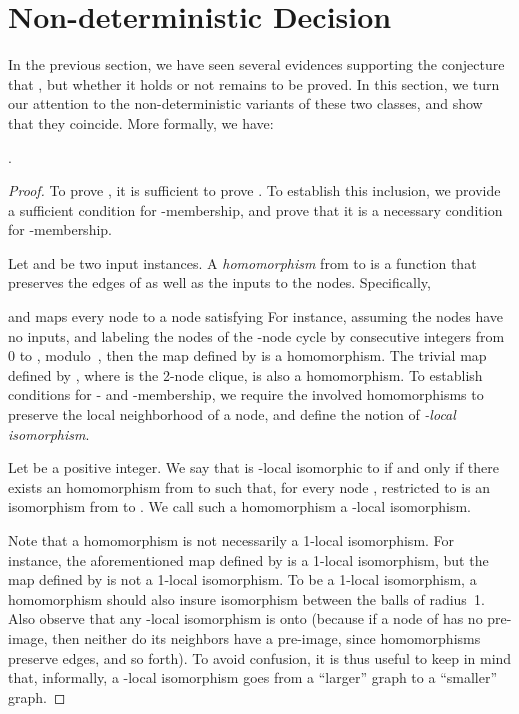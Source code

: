 \documentclass{llncs}
\begin{document}
\section{Non-deterministic Decision}
\label{sec:ndd}


In the previous section, we have seen several evidences supporting the conjecture that , but whether it holds or not remains to be proved. In this section, we turn our attention to the non-deterministic variants of these two classes, and show that they coincide. More formally, we have:  

\begin{theorem}\label{theo:NLD=NLD}
.
\end{theorem}

\begin{proof}
To prove , it is sufficient to prove . To establish this inclusion, we provide a sufficient condition for -membership, and prove that it is a necessary condition for  -membership. 

Let  and  be two input instances. A \emph{homomorphism} from  to  is a function  that preserves the edges of  as well as the inputs to the nodes. Specifically, 
 
and  maps every node  to a node  satisfying  For instance, assuming the nodes have no inputs, and labeling the nodes of the -node cycle  by consecutive integers from 0 to , modulo~, then the map  defined by  is a homomorphism. The trivial map  defined by , where  is the 2-node clique, is also a homomorphism. To establish conditions for - and -membership, we require the involved homomorphisms to preserve the local neighborhood of a node, and define the notion of \emph{-local isomorphism}.  

Let  be a positive integer. We say that  is -local isomorphic to  if and only if there exists an homomorphism  from  to  such that,  for every node ,  restricted to  is an isomorphism from   to . We call such a homomorphism  a -local isomorphism. 

Note that a homomorphism is not necessarily a 1-local isomorphism. For instance, the aforementioned map  defined by  is a 1-local isomorphism, but the map  defined by  is not a 1-local isomorphism. 
To be a 1-local isomorphism, a homomorphism should also insure isomorphism between the balls of radius~1. Also observe that any -local isomorphism  is onto (because if a node of  has no pre-image, then neither do its neighbors have a pre-image, since  homomorphisms preserve edges, and so forth). To avoid confusion, it is thus useful to keep in mind that, informally, a -local isomorphism goes from a ``larger'' graph to a ``smaller'' graph. 


\end{proof}
\end{document}
